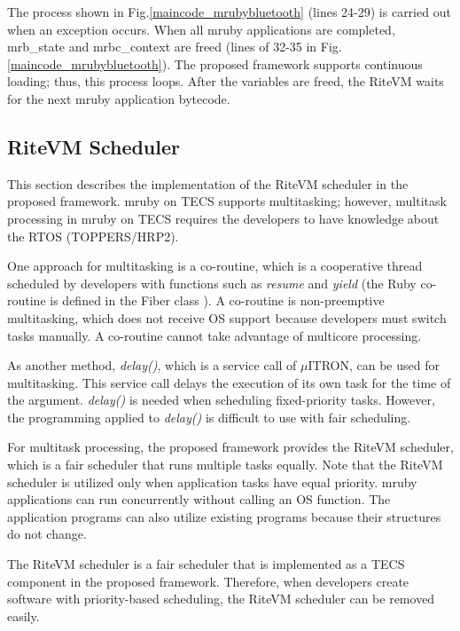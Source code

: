 \documentclass[S,R,E]{article/compsoft}
\begin{document}
The process shown in Fig.\ref{maincode_mrubybluetooth} (lines 24-29) is carried out when an exception occurs.
When all mruby applications are completed, mrb\_state and mrbc\_context are freed (lines of 32-35 in Fig.\ref{maincode_mrubybluetooth}).
The proposed framework supports continuous loading; thus, this process loops.
After the variables are freed, the RiteVM waits for the next mruby application bytecode.

\subsection{RiteVM Scheduler}
\label{sec:RiteVM Scheduler}
This section describes the implementation of the RiteVM scheduler in the proposed framework.
mruby on TECS supports multitasking; however, multitask processing in mruby on TECS requires the developers to have knowledge about the RTOS (TOPPERS/HRP2).

One approach for multitasking is a co-routine, which is a cooperative thread scheduled by developers with functions such as {\it resume} and {\it yield} (the Ruby co-routine is defined in the Fiber class \cite{url:co-routine}).
A co-routine is non-preemptive multitasking, which does not receive OS support because developers must switch tasks manually.
A co-routine cannot take advantage of multicore processing.

As another method, {\it delay()}, which is a service call of $\mu$ITRON, can be used for multitasking.
This service call delays the execution of its own task for the time of the argument.
{\it delay()} is needed when scheduling fixed-priority tasks.
However, the programming applied to {\it delay()} is difficult to use with fair scheduling.

For multitask processing, the proposed framework provides the RiteVM scheduler, which is a fair scheduler that runs multiple tasks equally.
Note that the RiteVM scheduler is utilized only when application tasks have equal priority.
mruby applications can run concurrently without calling an OS function.
The application programs can also utilize existing programs because their structures do not change.

The RiteVM scheduler is a fair scheduler that is implemented as a TECS component in the proposed framework.
Therefore, when developers create software with priority-based scheduling, the RiteVM scheduler can be removed easily.
\end{document}
